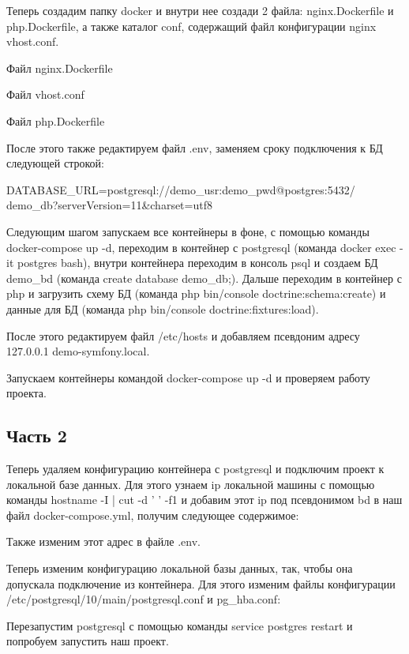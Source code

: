Теперь создадим папку docker и внутри нее создади 2 файла: nginx.Dockerfile и php.Dockerfile, а также каталог conf, содержащий файл конфигурации nginx vhost.conf. 

Файл nginx.Dockerfile


Файл vhost.conf


Файл php.Dockerfile



После этого также редактируем файл .env, заменяем сроку подключения к БД следующей строкой:

DATABASE\_URL=postgresql://demo\_usr:demo\_pwd@postgres:5432/  demo\_db?serverVersion=11\&charset=utf8

Следующим шагом запускаем все контейнеры в фоне, с помощью команды docker-compose up -d, переходим в контейнер с postgresql (команда docker exec -it postgres bash), внутри контейнера переходим в консоль psql и создаем БД demo\_bd (команда create database demo\_db;). Дальше переходим в контейнер с php и загрузить схему БД (команда php bin/console doctrine:schema:create) и данные для БД (команда php bin/console doctrine:fixtures:load).

После этого редактируем файл /etc/hosts и добавляем псевдоним адресу 127.0.0.1 demo-symfony.local.

Запускаем контейнеры командой docker-compose up -d и проверяем работу проекта.



\newpage
\subsection{Часть 2}

Теперь удаляем конфигурацию контейнера с postgresql и подключим проект к локальной базе данных. Для этого узнаем ip локальной машины с помощью команды hostname -I | cut -d ' ' -f1 и добавим этот ip под псевдонимом bd в наш файл docker-compose.yml, получим следующее содержимое:



Также изменим этот адрес в файле .env.

Теперь изменим конфигурацию локальной базы данных, так, чтобы она допускала подключение из контейнера. Для этого изменим файлы конфигурации /etc/postgresql/10/main/postgresql.conf и pg\_hba.conf:



Перезапустим postgresql с помощью команды service postgres restart и попробуем запустить наш проект.
 



